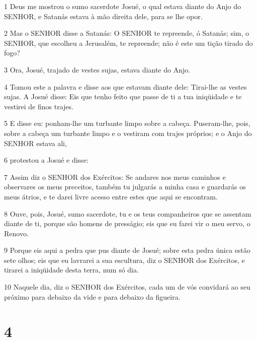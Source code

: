 \par 1 Deus me mostrou o sumo sacerdote Josué, o qual estava diante do Anjo do SENHOR, e Satanás estava à mão direita dele, para se lhe opor.
\par 2 Mas o SENHOR disse a Satanás: O SENHOR te repreende, ó Satanás; sim, o SENHOR, que escolheu a Jerusalém, te repreende; não é este um tição tirado do fogo?
\par 3 Ora, Josué, trajado de vestes sujas, estava diante do Anjo.
\par 4 Tomou este a palavra e disse aos que estavam diante dele: Tirai-lhe as vestes sujas. A Josué disse: Eis que tenho feito que passe de ti a tua iniqüidade e te vestirei de finos trajes.
\par 5 E disse eu: ponham-lhe um turbante limpo sobre a cabeça. Puseram-lhe, pois, sobre a cabeça um turbante limpo e o vestiram com trajes próprios; e o Anjo do SENHOR estava ali,
\par 6 protestou a Josué e disse:
\par 7 Assim diz o SENHOR dos Exércitos: Se andares nos meus caminhos e observares os meus preceitos, também tu julgarás a minha casa e guardarás os meus átrios, e te darei livre acesso entre estes que aqui se encontram.
\par 8 Ouve, pois, Josué, sumo sacerdote, tu e os teus companheiros que se assentam diante de ti, porque são homens de presságio; eis que eu farei vir o meu servo, o Renovo.
\par 9 Porque eis aqui a pedra que pus diante de Josué; sobre esta pedra única estão sete olhos; eis que eu lavrarei a sua escultura, diz o SENHOR dos Exércitos, e tirarei a iniqüidade desta terra, num só dia.
\par 10 Naquele dia, diz o SENHOR dos Exércitos, cada um de vós convidará ao seu próximo para debaixo da vide e para debaixo da figueira.

\chapter{4}

